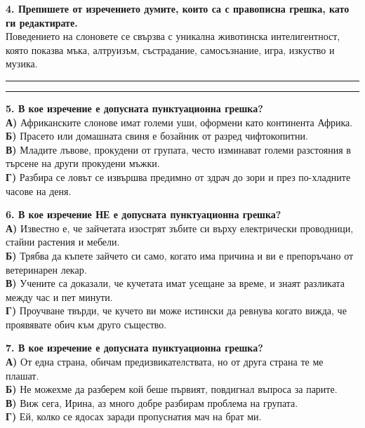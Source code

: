 \documentclass[12pt,a4paper]{article}
\begin{document}
\vspace{0.6cm}

\noindent
\textbf{4. Препишете от изречението думите, които са с правописна грешка, като ги редактирате.} \\
Поведението на слоновете се свързва с уникална животинска интелигентност, която показва мъка, алтруизъм, състрадание, самосъзнание, игра, изкуство и музика. \\
\vspace{0.2cm}
\noindent\rule{\linewidth}{0.4pt}
\noindent\rule{\linewidth}{0.4pt}

\vspace{0.6cm}

\noindent
\textbf{5. В кое изречение е допусната пунктуационна грешка?} \\
\textbf{А)} Африканските слонове имат големи уши, оформени като континента Африка. \\
\textbf{Б)} Прасето или домашната свиня е бозайник от разред чифтокопитни. \\
\textbf{В)} Младите лъвове, прокудени от групата, често изминават големи разстояния в търсене на други прокудени мъжки. \\
\textbf{Г)} Разбира се ловът се извършва предимно от здрач до зори и през по-хладните часове на деня.

\vspace{0.6cm}

\noindent
\textbf{6. В кое изречение НЕ е допусната пунктуационна грешка?} \\
\textbf{А)} Известно е, че зайчетата изострят зъбите си върху електрически проводници, стайни растения и мебели. \\
\textbf{Б)} Трябва да къпете зайчето си само, когато има причина и ви е препоръчано от ветеринарен лекар. \\
\textbf{В)} Учените са доказали, че кучетата имат усещане за време, и знаят разликата между час и пет минути. \\
\textbf{Г)} Проучване твърди, че кучето ви може истински да ревнува когато вижда, че проявявате обич към друго същество.

\vspace{0.6cm}

\noindent
\textbf{7. В кое изречение е допусната пунктуационна грешка?} \\
\textbf{А)} От една страна, обичам предизвикателствата, но от друга страна те ме плашат. \\
\textbf{Б)} Не можехме да разберем кой беше първият, повдигнал въпроса за парите. \\
\textbf{В)} Виж сега, Ирина, аз много добре разбирам проблема на групата. \\
\textbf{Г)} Ей, колко се ядосах заради пропуснатия мач на брат ми.
\end{document}
